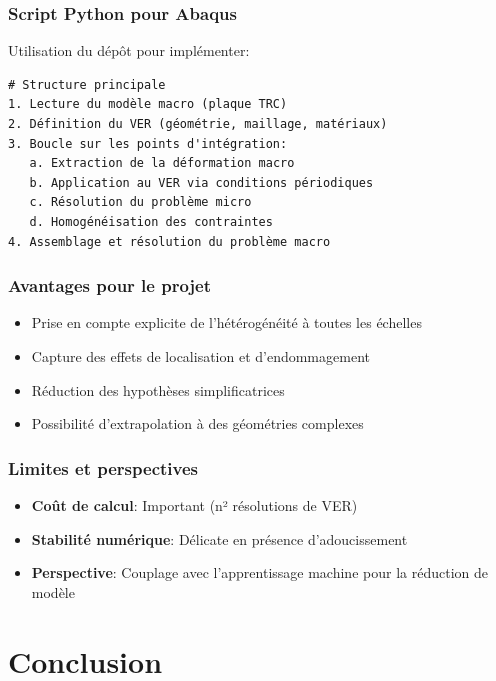 \documentclass{rapportECL}
\begin{document}
\subsubsection{Script Python pour Abaqus}

Utilisation du dépôt \cite{Yeoh2025} pour implémenter:

\begin{verbatim}
# Structure principale
1. Lecture du modèle macro (plaque TRC)
2. Définition du VER (géométrie, maillage, matériaux)
3. Boucle sur les points d'intégration:
   a. Extraction de la déformation macro
   b. Application au VER via conditions périodiques
   c. Résolution du problème micro
   d. Homogénéisation des contraintes
4. Assemblage et résolution du problème macro
\end{verbatim}

\subsubsection{Avantages pour le projet}

\begin{itemize}
\item Prise en compte explicite de l'hétérogénéité à toutes les échelles
\item Capture des effets de localisation et d'endommagement
\item Réduction des hypothèses simplificatrices
\item Possibilité d'extrapolation à des géométries complexes
\end{itemize}

\subsubsection{Limites et perspectives}

\begin{itemize}
\item \textbf{Coût de calcul}: Important (n² résolutions de VER)
\item \textbf{Stabilité numérique}: Délicate en présence d'adoucissement
\item \textbf{Perspective}: Couplage avec l'apprentissage machine pour la réduction de modèle
\end{itemize}

\section{Conclusion}
\end{document}

